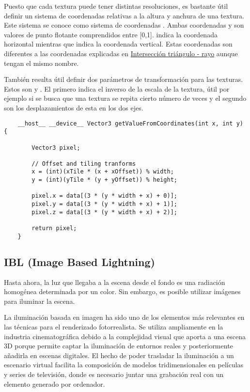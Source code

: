 Puesto que cada textura puede tener distintas resoluciones, es bastante útil definir un sistema de coordenadas relativas a la altura y anchura de una textura. Este sistema se conoce como sistema de coordenadas . Ambas coordenadas  y  son valores de punto flotante comprendidos entre [0,1].  indica la coordenada horizontal mientras que  indica la coordenada vertical. Estas coordenadas son diferentes a las coordenadas  explicadas en \hyperref[subsec:triintersection]{Intersección triángulo - rayo} aunque tengan el mismo nombre.

También resulta útil definir dos parámetros de transformación para las texturas. Estos son  y . El primero indica el inverso de la escala de la textura, útil por ejemplo si se busca que una textura se repita cierto número de veces y el segundo son los desplazamientos de esta en los dos ejes.

\begin{minipage}[c]{0.95\textwidth}
\begin{lstlisting}
	__host__ __device__ Vector3 getValueFromCoordinates(int x, int y) {
	
        Vector3 pixel;

        // Offset and tiling tranforms
        x = (int)(xTile * (x + xOffset)) % width;
        y = (int)(yTile * (y + yOffset)) % height;

        pixel.x = data[(3 * (y * width + x) + 0)];
        pixel.y = data[(3 * (y * width + x) + 1)];
        pixel.z = data[(3 * (y * width + x) + 2)];

        return pixel;
    }
\end{lstlisting}
\end{minipage}

\subsection{IBL (Image Based Lightning)}
	
Hasta ahora, la luz que llegaba a la escena desde el fondo es una radiación homogénea determinada por un color. Sin embargo, es posible utilizar imágenes para iluminar la escena.
	
La iluminación basada en imagen ha sido uno de los elementos más relevantes en las técnicas para el renderizado fotorrealista. Se utiliza ampliamente en la industria cinematográfica debido a la complejidad visual que aporta a una escena 3D porque permite captar la iluminación de entornos reales y posteriormente añadirla en escenas digitales. El hecho de poder trasladar la iluminación a un escenario virtual facilita la composición de modelos tridimensionales en películas y series de televisión, donde es necesario juntar una grabación real con un elemento generado por ordenador.

